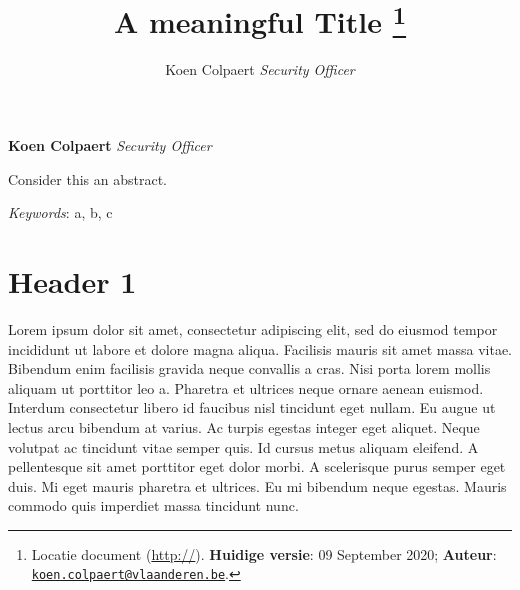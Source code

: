 \documentclass[11pt,]{article}
\title{A meaningful Title \thanks{Locatie document (\url{http://}).
\textbf{Huidige versie}: 09 September 2020; \textbf{Auteur}:
\href{mailto:koen.colpaert@vlaanderen.be}{\nolinkurl{koen.colpaert@vlaanderen.be}}.}  }
\author{\Large Koen
Colpaert\vspace{0.05in} \newline\normalsize\emph{Security Officer}  }
\date{}
\newcommand*{\authorfont}{\fontfamily{phv}\selectfont}
\renewenvironment{abstract}
 {{%
    \setlength{\leftmargin}{0mm}
    \setlength{\rightmargin}{\leftmargin}%
  }%
  \relax}
 {\endlist}
\begin{document}
	
%    


{%
\setlength{\parindent}{0pt}
\thispagestyle{plain}
{\fontsize{18}{20}\selectfont\raggedright 
\maketitle  %

}

{
   \vskip 13.5pt\relax \normalsize\fontsize{11}{12} 
\textbf{\authorfont Koen Colpaert} \hskip 15pt \emph{\small Security
Officer}   

}

}








\begin{abstract}

    \hbox{\vrule height .2pt width 39.14pc}

    \vskip 8.5pt %

\noindent Consider this an abstract.


\vskip 8.5pt \noindent \emph{Keywords}: a, b, c \par

    \hbox{\vrule height .2pt width 39.14pc}



\end{abstract}


\vskip -8.5pt



\noindent  

\hypertarget{header-1}{%
\section{Header 1}\label{header-1}}

Lorem ipsum dolor sit amet, consectetur adipiscing elit, sed do eiusmod
tempor incididunt ut labore et dolore magna aliqua. Facilisis mauris sit
amet massa vitae. Bibendum enim facilisis gravida neque convallis a
cras. Nisi porta lorem mollis aliquam ut porttitor leo a. Pharetra et
ultrices neque ornare aenean euismod. Interdum consectetur libero id
faucibus nisl tincidunt eget nullam. Eu augue ut lectus arcu bibendum at
varius. Ac turpis egestas integer eget aliquet. Neque volutpat ac
tincidunt vitae semper quis. Id cursus metus aliquam eleifend. A
pellentesque sit amet porttitor eget dolor morbi. A scelerisque purus
semper eget duis. Mi eget mauris pharetra et ultrices. Eu mi bibendum
neque egestas. Mauris commodo quis imperdiet massa tincidunt nunc.
\end{document}
